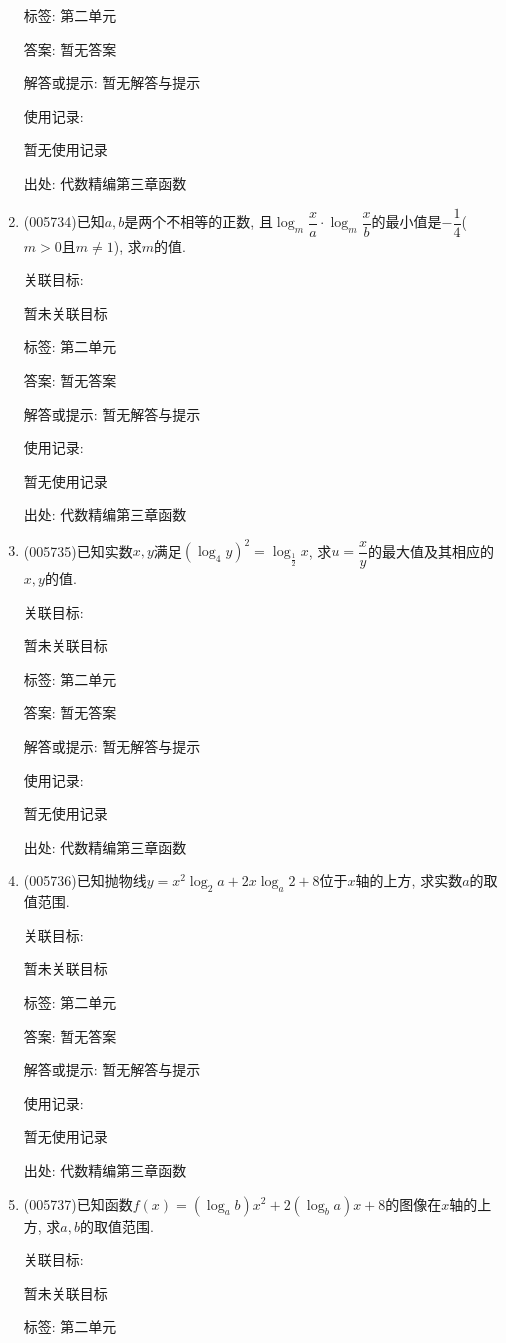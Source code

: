\documentclass[10pt,a4paper]{article}
\begin{document}
\begin{enumerate}[1.]
标签: 第二单元

答案: 暂无答案

解答或提示: 暂无解答与提示

使用记录:

暂无使用记录


出处: 代数精编第三章函数
\item { (005734)}已知$a,b$是两个不相等的正数, 且$\log_m\dfrac xa\cdot \log_m\dfrac xb$的最小值是$-\dfrac 14$($m>0$且$m\ne 1$), 求$m$的值.


关联目标:

暂未关联目标



标签: 第二单元

答案: 暂无答案

解答或提示: 暂无解答与提示

使用记录:

暂无使用记录


出处: 代数精编第三章函数
\item { (005735)}已知实数$x,y$满足$(\log_4y)^2=\log_{\frac 12}x$, 求$u=\dfrac xy$的最大值及其相应的$x,y$的值.


关联目标:

暂未关联目标



标签: 第二单元

答案: 暂无答案

解答或提示: 暂无解答与提示

使用记录:

暂无使用记录


出处: 代数精编第三章函数
\item { (005736)}已知抛物线$y=x^2\log_2a+2x\log_a2+8$位于$x$轴的上方, 求实数$a$的取值范围.


关联目标:

暂未关联目标



标签: 第二单元

答案: 暂无答案

解答或提示: 暂无解答与提示

使用记录:

暂无使用记录


出处: 代数精编第三章函数
\item { (005737)}已知函数$f(x)=(\log_ab)x^2+2(\log_ba)x+8$的图像在$x$轴的上方, 求$a,b$的取值范围.


关联目标:

暂未关联目标



标签: 第二单元


\end{enumerate}
\end{document}
